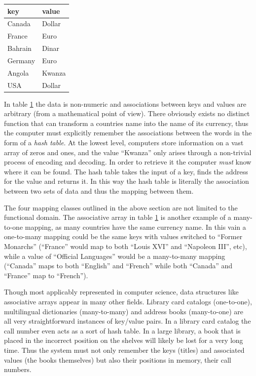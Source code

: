 \begin{table}
\centering
{}
\label{tab:key_value_pairs}
\begin{tabular}{l l}
\hline\hline
key&value\\
\hline
Canada&Dollar\\
France&Euro\\
Bahrain&Dinar\\
Germany&Euro\\
Angola&Kwanza\\
USA&Dollar\\
\hline
\end{tabular}
\end{table}

In table \ref{tab:key_value_pairs} the data is non-numeric and associations between keys and values are arbitrary (from a mathematical point of view). There obviously exists no distinct function that can transform a countries name into the name of its currency, thus the computer must explicitly remember the associations between the words in the form of a \emph{hash table}. At the lowest level, computers store information on a vast array of zeros and ones, and the value ``Kwanza'' only arises through a non-trivial process of encoding and decoding. In order to retrieve it the computer \emph{must} know where it can be found. The hash table takes the input of a key, finds the address for the value and returns it. In this way the hash table is literally the association between two sets of data and thus the mapping between them. 

The four mapping classes outlined in the above section are not limited to the functional domain. The associative array in table \ref{tab:key_value_pairs} is another example of a many-to-one mapping, as many countries have the same currency name. In this vain a one-to-many mapping could be the same keys with values switched to ``Former Monarchs'' (``France'' would map to both ``Louis XVI'' and ``Napoleon III'', etc), while a value of ``Official Languages'' would be a many-to-many mapping (``Canada'' maps to both ``English'' and ``French'' while both ``Canada'' and ``France'' map to ``French'').

Though most applicably represented in computer science, data structures like associative arrays appear in many other fields. Library card catalogs (one-to-one), multilingual dictionaries (many-to-many) and address books (many-to-one) are all very straightforward instances of key/value pairs. In a library card catalog the call number even acts as a sort of hash table. In a large library, a book that is placed in the incorrect position on the shelves will likely be lost for a very long time. Thus the system must not only remember the keys (titles) and associated values (the books themselves) but also their positions in memory, their call numbers.

